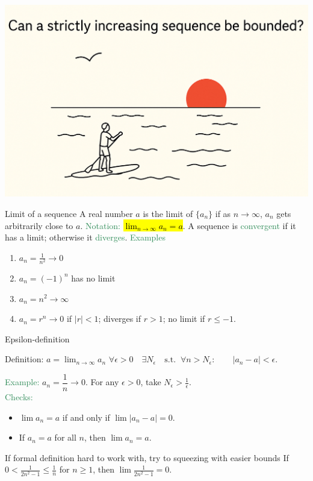 \documentclass[11pt,aspectratio=169]{beamer}
\begin{document}
{
\begin{frame}[plain]
\centering\includegraphics[scale=0.27]{vbreaks/question1.png}
\end{frame}
}


\begin{frame}{Limit of a sequence}
 A real number $a$ is the \alert{limit} of $\{a_n\}$ if as $n\to\infty$, $a_n$ gets arbitrarily close to $a$. \textcolor{SeaGreen}{Notation:} \hl{$\lim_{n \rightarrow \infty} a_n=a$}.
\vskip 8pt
A sequence is \textcolor{SeaGreen}{convergent} if it has a limit; otherwise it \textcolor{SeaGreen}{diverges}.
\vskip 8pt
\textcolor{SeaGreen}{Examples} 
\begin{enumerate}
\item $a_n=\frac{1}{n^2}\to 0$
\item $a_n=(-1)^n$ has no limit
\item $a_n=n^2\to \infty$
\item $a_n=r^n\to 0$ if $|r|<1$; diverges if $r>1$; no limit if $r\le -1$.
\end{enumerate}
\end{frame}



\begin{frame}{Epsilon-definition}
\begin{alertblock}{Definition: $a=\lim_{n\to\infty}a_n$}
\qquad$
\forall \epsilon >0 \quad\exists N_\epsilon\quad\text{s.t.}\;\;\forall n>N_\epsilon:\qquad |a_n-a| < \epsilon.
$	
\end{alertblock}

 \textcolor{SeaGreen}{Example:}  $a_n=\dfrac{1}{n}\to 0$. For any $\epsilon>0$, take $N_\epsilon>\frac{1}{\epsilon}$. \\[4mm]
 \textcolor{SeaGreen}{Checks:} 
 \begin{itemize}
 	\item $\lim a_n=a$ if and only if $\lim |a_n-a|=0$.
 	\item If $a_n=a$ for all $n$, then $\lim a_n=a$.
 \end{itemize}
\bigskip
\begin{block}{If formal definition hard to work with, try to squeezing with easier bounds}
If $0<\frac{1}{2n^2-1}\le \frac{1}{n}$ for $n\ge 1$, then $\lim \frac{1}{2n^2-1}=0$.
\end{block}
\end{frame}
\end{document}
